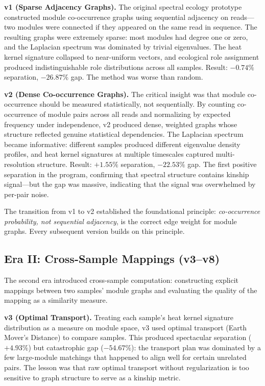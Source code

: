 \documentclass{../yalumba}
\begin{document}
\textbf{v1 (Sparse Adjacency Graphs).}  The original spectral ecology
prototype constructed module co-occurrence graphs using sequential
adjacency on reads---two modules were connected if they appeared on
the same read in sequence.  The resulting graphs were extremely sparse:
most modules had degree one or zero, and the Laplacian spectrum was
dominated by trivial eigenvalues.  The heat kernel signature collapsed
to near-uniform vectors, and ecological role assignment produced
indistinguishable role distributions across all samples.  Result:
$-0.74\%$ separation, $-26.87\%$ gap.  The method was worse than random.


\textbf{v2 (Dense Co-occurrence Graphs).}  The critical insight was that
module co-occurrence should be measured statistically, not sequentially.
By counting co-occurrence of module pairs across all reads and normalizing
by expected frequency under independence, v2 produced dense, weighted
graphs whose structure reflected genuine statistical dependencies.  The
Laplacian spectrum became informative: different samples produced
different eigenvalue density profiles, and heat kernel signatures at
multiple timescales captured multi-resolution structure.  Result:
$+1.55\%$ separation, $-22.53\%$ gap.  The first positive separation
in the program, confirming that spectral structure contains kinship
signal---but the gap was massive, indicating that the signal was
overwhelmed by per-pair noise.

\begin{keyfinding}
The transition from v1 to v2 established the foundational principle:
\emph{co-occurrence probability, not sequential adjacency}, is the
correct edge weight for module graphs.  Every subsequent version builds
on this principle.
\end{keyfinding}

\subsection{Era II: Cross-Sample Mappings (v3--v8)}

The second era introduced cross-sample computation: constructing
explicit mappings between two samples' module graphs and evaluating
the quality of the mapping as a similarity measure.

\textbf{v3 (Optimal Transport).}  Treating each sample's heat kernel
signature distribution as a measure on module space, v3 used optimal
transport (Earth Mover's Distance) to compare samples.  This produced
spectacular separation ($+4.93\%$) but catastrophic gap ($-54.67\%$):
the transport plan was dominated by a few large-module matchings that
happened to align well for certain unrelated pairs.  The lesson was
that raw optimal transport without regularization is too sensitive to
graph structure to serve as a kinship metric.
\end{document}
